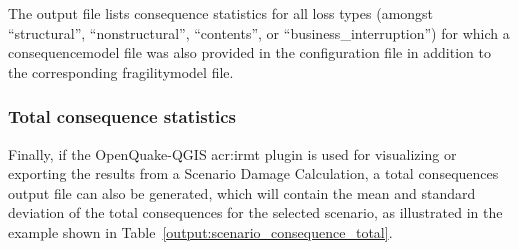 

The output file lists consequence statistics for all loss types (amongst
``structural'', ``nonstructural'', ``contents'', or
``business\_interruption'') for which a \gls{consequencemodel} file was also
provided in the configuration file in addition to the corresponding
\gls{fragilitymodel} file.


\subsubsection{Total consequence statistics}
\label{subsubsec:scenario_total_consequence_statistics}

Finally, if the OpenQuake-QGIS \gls{acr:irmt} plugin is used for visualizing
or exporting the results from a Scenario Damage Calculation, a total
consequences output file can also be generated, which will contain the mean and
standard deviation of the total consequences for the selected scenario, as
illustrated in the example shown in
Table~\ref{output:scenario_consequence_total}.


